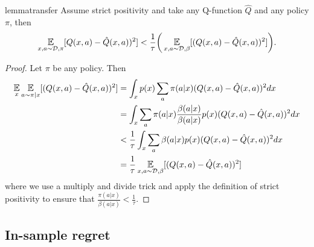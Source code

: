 \begin{restatable}{lemma}{transfer}\label{lem:transfer}
Assume strict positivity and take any Q-function $ \hat Q $ and any policy $ \pi$, then
\begin{align}
    \E_{x, a\sim \mathcal{D}, \pi}[Q(x,a) - \hat Q(x,a))^2] < \frac{1}{\tau}\bigg(\E_{x,a \sim \mathcal{D}, \beta}[(Q(x,a) - \hat Q(x,a))^2]\bigg).
\end{align}
\end{restatable}
\begin{proof} Let $ \pi$ be any policy. Then
\begin{align}
    \E_{x}\E_{a\sim \pi|x} [(Q(x,a) - \hat Q(x,a))^2] &=  \int_x p(x) \sum_a \pi(a|x) (Q(x,a) - \hat Q(x,a))^2 dx \\
    &=  \int_x \sum_a \pi(a|x) \frac{\beta(a|x)}{\beta(a|x)} p(x) (Q(x,a) - \hat Q(x,a))^2 dx \\
    &<  \frac{1}{\tau}\int_x \sum_a \beta(a|x) p(x) (Q(x,a) - \hat Q(x,a))^2 dx\\
    &= \frac{1}{\tau} \E_{x,a \sim \mathcal{D}, \beta}[(Q(x,a) - \hat Q(x,a))^2]
\end{align}
where we use a multiply and divide trick and apply the definition of strict positivity to ensure that $ \frac{\pi(a|x)}{\beta(a|x)} < \frac{1}{\tau}$.
\end{proof}


\label{app:pb}


\subsection{In-sample regret}



